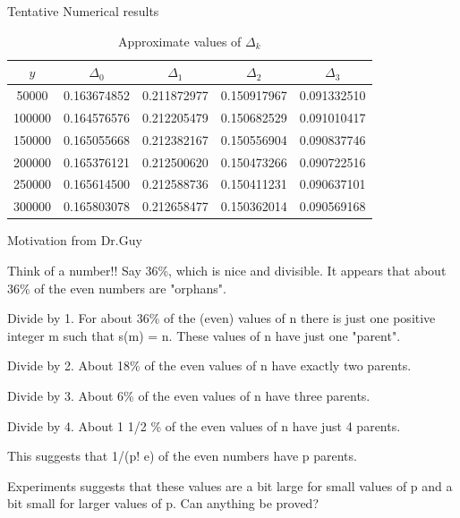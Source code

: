 \documentclass{beamer}
\begin{document}
\begin{frame}{Tentative Numerical results}
\begin{center}
\begin{table}[]
    \centering
    \begin{tabular}{| c | c | c | c | c |}
\hline
 $y$ & $\Delta_0$ & $\Delta_1$ & $\Delta_2$ & $\Delta_3$ \\ 
 \hline
 \hline
 50000 & 0.163674852 & 0.211872977 & 0.150917967 & 0.091332510\\  
 100000 & 0.164576576 & 0.212205479 & 0.150682529 & 0.091010417\\
 150000 & 0.165055668 & 0.212382167 & 0.150556904 & 0.090837746\\
 200000 & 0.165376121 & 0.212500620 & 0.150473266 & 0.090722516 \\
250000 & 0.165614500 & 0.212588736 & 0.150411231 & 0.090637101\\
300000 & 0.165803078 & 0.212658477 & 0.150362014 & 0.090569168\\
\hline
\end{tabular}
    \caption{Approximate values of $\Delta_k$}
    \label{tab:my_label}
\end{table}

\end{center}
\end{frame}

\begin{frame}{Motivation from Dr.Guy}

\small{Think of a number!! Say 36\%, which is nice and divisible. It appears that about 36\% of the even numbers are "orphans". \linebreak

Divide by 1. For about 36\% of the (even) values of n there is just one positive integer m such that s(m) = n. These values of n have just one "parent". \linebreak

Divide by 2.  About 18\% of the even values of n have exactly two parents. \linebreak

Divide by 3. About 6\% of the even values of n have three parents. \linebreak

Divide by 4. About 1 1/2 \% of the even values of n have just 4 parents.  \linebreak

This suggests that 1/(p! e) of the even numbers have p parents.\linebreak

Experiments suggests that these values are a bit large for small values of p and a bit small for larger values of p. Can anything be proved?\\}
\end{frame}
\end{document}
